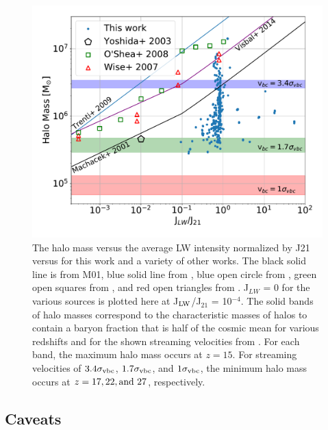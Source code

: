 \documentclass[fleqn,usenatbib]{mnras}
\begin{document}
\begin{figure}
	\includegraphics[width=\columnwidth]{images/compare_JLW_mass.pdf}
    \caption{The halo mass versus the average LW intensity normalized by J21 versus for this work and a variety of other works. The black solid line is from M01, blue solid line from \citet{Trenti09_SFR}, blue open circle from \citet{Yoshida03}, green open squares from \citet{OShea08}, and red open triangles from \citet{Wise07_UVB}. J$_{LW}$ = 0 for the various sources is plotted here at J$_{\rm LW}$/J$_{21}$ = 10$^{-4}$. The solid bands of halo masses correspond to the characteristic masses of halos to contain a baryon fraction that is half of the cosmic mean for various redshifts and for the shown streaming velocities from \citet{Naoz13}. For each band, the maximum halo mass occurs at $z = 15$. For streaming velocities of $3.4 \sigma_{\rm vbc}$, $1.7 \sigma_{\rm vbc}$, and $1 \sigma_{\rm vbc}$, the minimum halo mass occurs at $z = 17, 22, \rm{and} \ 27$, respectively.}
    \label{fig:compare_JLW_mass}
\end{figure}

\subsection{Caveats}
\end{document}
